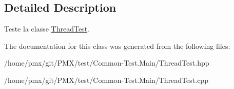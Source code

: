 \subsection{Detailed Description}
Teste la classe \hyperlink{classtest_1_1ThreadTest}{Thread\+Test}. 

The documentation for this class was generated from the following files\+:\begin{DoxyCompactItemize}
\item 
/home/pmx/git/\+P\+M\+X/test/\+Common-\/\+Test.\+Main/Thread\+Test.\+hpp\item 
/home/pmx/git/\+P\+M\+X/test/\+Common-\/\+Test.\+Main/Thread\+Test.\+cpp\end{DoxyCompactItemize}
